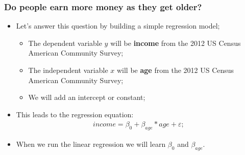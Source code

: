\documentclass[aspectratio=169]{beamer}
\theoremstyle{principle}
\begin{document}
%

%
%
%
%
%
%
%

\begin{frame}
\frametitle{Do people earn more money as they get older?}

\begin{itemize}
\item Let's answer this question by building a simple regression model;
\begin{itemize}
\item The dependent variable $y$ will be \textbf{income} from the 2012 US Census American Community Survey;
\item The independent variable $x$ will be \textbf{age} from the 2012 US Census American Community Survey;
\item We will add an intercept or constant;
\end{itemize}
\bigskip
\bigskip

\item This leads to the regression equation:
\begin{align*}
income = \beta_{0} + \beta_{age}*age + \varepsilon;
\end{align*}

\item When we run the linear regression we will learn $\beta_{0}$ and $\beta_{age}$.

\end{itemize}

\end{frame}
\end{document}

